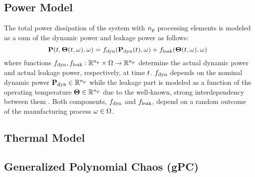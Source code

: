 \subsection{Power Model} 
The total power dissipation of the system with ${n_p}$ processing elements is modeled as a sum of the dynamic power and leakage power as follows:
\begin{equation} \elabel{power-model}
  \vP(\t, \vTO(\t, \o), \o) = f_\dyn(\vP_\dyn(\t), \o) + f_\leak(\vTO(\t, \o), \o)
\end{equation}
where functions $f_{\text{dyn}}, f_{\text{leak}}: \mathbb{R}^{n_p} \times \Omega \to \mathbb{R}^{n_p}$ determine the actual dynamic power and actual leakage power, respectively, at time $t$. $f_{\text{dyn}}$ depends on the nominal dynamic power $\mathbf{P}_{\text{dyn}} \in \mathbb{R}^{n_p}$ while the leakage part is modeled as a function of the operating temperature ${\boldsymbol\Theta} \in \mathbb{R}^{n_p}$ due to the well-known, strong interdependency between them \cite{srivastava2010, liu2007}. Both components, $f_{\text{dyn}}$ and $f_{\text{leak}}$, depend on a random outcome of the manufacturing process $\omega \in \Omega$.

\subsection{Thermal Model} 


\subsection{Generalized Polynomial Chaos (gPC)}

